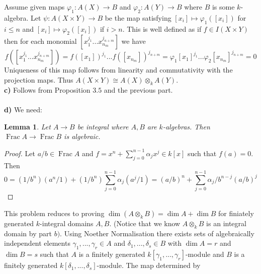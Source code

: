 \documentclass[12pt]{article}
\numberwithin{thm}{subsection}
\numberwithin{defn}{subsection}
\newtheorem{lemma}{Lemma}
\numberwithin{lemma}{subsection}
\numberwithin{example}{subsection}
\numberwithin{notation}{subsection}
\numberwithin{cor}{subsection}
\numberwithin{remark}{subsection}
\numberwithin{condition}{subsection}
\numberwithin{question}{subsection}
\numberwithin{construction}{subsection}
\numberwithin{construction}{subsection}
\numberwithin{construction}{subsection}
\newcommand{\lto}{\longrightarrow}
\begin{document}
Assume given maps $\varphi_1:A(X) \lto B$ and $\varphi_2: A(Y) \lto B$ where $B$ is some $k$-algebra. Let $\psi: A(X \times Y) \lto B$ be the map satisfying $[x_i] \mapsto \varphi_1([x_i])$ for $i \leq n$ and $[x_i] \mapsto \varphi_2([x_i])$ if $i > n$. This is well defined as if $f \in I(X \times Y)$ then for each monomial $[x_1^{j_1}...x_{n_m}^{j_{n+m}}]$ we have
\[f([x_1^{j_1}...x_{n_m}^{j_{n+m}}]) = f([x_1])^{j_1}...f([x_{n_m}])^{j_{n+m}} = \varphi_1 [x_1]^{j_1}...\varphi_2[x_{n_m}]^{j_{n+m}} = 0\]
Uniqueness of this map follows from linearity and commutativity with the projection maps. Thus $A(X \times Y) \cong A(X )\otimes_k A(Y)$.\\
%
\textbf{c)} Follows from Proposition $3.5$ and the previous part.\\\\
%
\textbf{d)} 
We need:
%
\begin{lemma}
\label{lem:int_implies_alg} Let $A \lto B$ be integral where $A,B$ are $k$-algebras. Then $\operatorname{Frac}A \lto \operatorname{Frac}B$ is algebraic.
\end{lemma}
\begin{proof}
Let $a/b \in \operatorname{Frac}A$ and $f = x^n + \sum_{j = 0}^{n-1}\alpha_j x^j \in k[x]$ such that $f(a) = 0$. Then
\[0 = (1/b^n)(a^n/1) + (1/b^n)\sum_{j = 0}^{n-1}\alpha_j(a^j/1) = (a/b)^n + \sum_{j = 0}^{n-1}\alpha_j/b^{n-j} (a/b)^j\]
\end{proof}
%
This problem reduces to proving $\operatorname{dim}(A \otimes_k B) = \operatorname{dim}A + \operatorname{dim}B$ for finiately generated $k$-integral domains $A,B$. (Notice that we know $A \otimes_k B$ is an integral domain by part $b)$. Using Noether Normalisation there exists sets of algebraically independent elements $\gamma_1,...,\gamma_r \in A$ and $\delta_1,...,\delta_s \in B$ with $\operatorname{dim}A = r$ and $\operatorname{dim}B = s$ such that $A$ is a finitely generated $k[\gamma_1,...,\gamma_r]$-module and $B$ is a finitely generated $k[\delta_1,...,\delta_s]$-module. The map determined by
\end{document}
